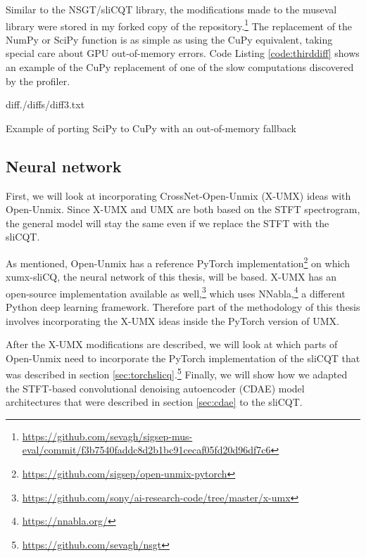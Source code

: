 \documentclass[report.tex]{subfiles}
\begin{document}
Similar to the NSGT/sliCQT library, the modifications made to the museval library were stored in my forked copy of the repository.\footnote{\url{https://github.com/sevagh/sigsep-mus-eval/commit/f3b7540faddc8d2b1bc91cecaf05fd20d96df7c6}} The replacement of the NumPy or SciPy function is as simple as using the CuPy equivalent, taking special care about GPU out-of-memory errors. Code Listing \ref{code:thirddiff} shows an example of the CuPy replacement of one of the slow computations discovered by the profiler.

\begin{listing}[ht]
  \centering
\begin{inputminted}[linenos,breaklines,frame=single,fontsize=\scriptsize]{diff}{./diffs/diff3.txt}
\end{inputminted}
  \caption{Example of porting SciPy to CuPy with an out-of-memory fallback}
  \label{code:thirddiff}
\end{listing}

\newpagefill

\subsection{Neural network}
\label{sec:neuralnet}

First, we will look at incorporating CrossNet-Open-Unmix (X-UMX) ideas with Open-Unmix. Since X-UMX and UMX are both based on the STFT spectrogram, the general model will stay the same even if we replace the STFT with the sliCQT.

As mentioned, Open-Unmix has a reference PyTorch implementation\footnote{\url{https://github.com/sigsep/open-unmix-pytorch}} on which xumx-sliCQ, the neural network of this thesis, will be based. X-UMX has an open-source implementation available as well,\footnote{\url{https://github.com/sony/ai-research-code/tree/master/x-umx}} which uses NNabla,\footnote{\url{https://nnabla.org/}} a different Python deep learning framework. Therefore part of the methodology of this thesis involves incorporating the X-UMX ideas inside the PyTorch version of UMX.

After the X-UMX modifications are described, we will look at which parts of Open-Unmix need to incorporate the PyTorch implementation of the sliCQT that was described in section \ref{sec:torchslicq}.\footnote{\url{https://github.com/sevagh/nsgt}} Finally, we will show how we adapted the STFT-based convolutional denoising autoencoder (CDAE) model architectures that were described in section \ref{sec:cdae} to the sliCQT.
\end{document}
